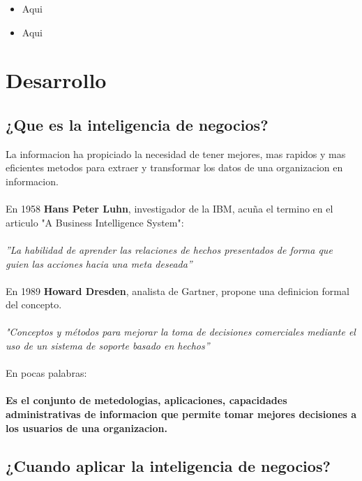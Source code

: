 \documentclass[twoside,twocolumn]{article}
\begin{document}
\begin{itemize}
\item Aqui
\item Aqui

\end{itemize}




\section{Desarrollo}

\subsection{¿Que es la inteligencia de negocios?}

La informacion ha propiciado la necesidad de tener mejores, mas rapidos y mas eficientes metodos para extraer y transformar los datos de una organizacion en informacion.
\\ \\
En 1958 \textbf{Hans Peter Luhn}, investigador de la IBM, acuña el termino en el articulo "A Business Intelligence System":
\\ \\
\textsl{''La habilidad de aprender las relaciones de hechos presentados de forma que guien las acciones hacia una meta deseada''}
\\ \\
En 1989 \textbf{Howard Dresden}, analista de Gartner, propone una definicion formal del concepto.
\\ \\
\textsl{"Conceptos y métodos para mejorar la toma de decisiones comerciales mediante el uso de un sistema de soporte basado en hechos''}
\\ \\
En pocas palabras: \\ \\
\textbf{Es el conjunto de metedologias, aplicaciones, capacidades administrativas de informacion que permite tomar mejores decisiones a los usuarios de una organizacion.}


\subsection{¿Cuando aplicar la inteligencia de negocios?}
\end{document}
